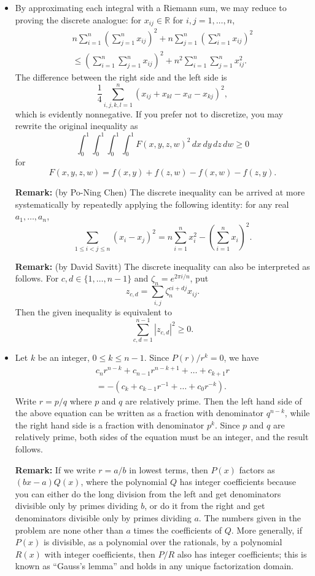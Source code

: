 \documentclass[amssymb,twocolumn,pra,10pt,aps]{revtex4-1}
\newcommand{\RR}{\mathbb{R}}
\begin{document}
\begin{itemize}
\item[A6]
By approximating each integral with a Riemann sum, we may reduce to
proving the discrete analogue: for $x_{ij} \in \RR$ for
$i,j=1, \dots, n$,
\begin{multline*}
n \sum_{i=1}^n \left( \sum_{j=1}^n x_{ij} \right)^2
+ n \sum_{j=1}^n \left( \sum_{i=1}^n x_{ij} \right)^2 \\
\leq \left( \sum_{i=1}^n \sum_{j=1}^n x_{ij} \right)^2
+ n^2 \sum_{i=1}^n \sum_{j=1}^n x_{ij}^2.
\end{multline*}
The difference between the right side and the left side is
\[
\frac{1}{4} \sum_{i,j,k,l=1}^n (x_{ij} + x_{kl} - x_{il} - x_{kj})^2,
\]
which is evidently nonnegative. If you prefer not to discretize,
you may rewrite the original inequality as
\[
\int_0^1 \int_0^1 \int_0^1 \int_0^1 F(x,y,z,w)^2
\,dx\,dy\,dz\,dw \geq 0
\]
for
\[
F(x,y,z,w) = f(x,y) + f(z,w) - f(x,w) - f(z,y).
\]

\textbf{Remark:} (by Po-Ning Chen)
The discrete inequality can be arrived at more systematically
by repeatedly applying the following identity: for
any real $a_1, \dots, a_n$,
\[
\sum_{1 \leq i < j \leq n} (x_i - x_j)^2
= n \sum_{i=1}^n x_i^2 - \left( \sum_{i=1}^n x_i \right)^2.
\]

\textbf{Remark:} (by David Savitt)
The discrete inequality can also be interpreted as follows.
For $c,d \in \{1, \dots, n-1\}$ and $\zeta_n = e^{2\pi i/n}$, put
\[
z_{c,d} = \sum_{i,j} \zeta_n^{c i + d j} x_{ij}.
\]
Then the given inequality is equivalent to
\[
\sum_{c,d=1}^{n-1} |z_{c,d}|^2 \geq 0.
\]

\item[B1]
Let $k$ be an integer, $0\leq k\leq n-1$. Since $P(r)/r^k = 0$, we
have
\begin{multline*}
c_n r^{n-k} + c_{n-1} r^{n-k+1} + \dots + c_{k+1} r \\
= - (c_k + c_{k-1} r^{-1} + \dots + c_0 r^{-k}).
\end{multline*}
Write $r = p/q$ where $p$ and $q$ are relatively prime. Then the
left hand side of the above equation can be written as a fraction
with denominator $q^{n-k}$, while the right hand side is a fraction
with denominator $p^k$. Since $p$ and $q$ are relatively prime, both
sides of the equation must be an integer, and the result follows.

\textbf{Remark:}
If we write $r = a/b$ in lowest terms, then $P(x)$ factors as $(bx-a)Q(x)$,
where the polynomial $Q$ has integer coefficients because you can
either do the long division from the left and get denominators divisible only
by primes dividing $b$, or do it from the right and get denominators
divisible only by primes dividing $a$. The numbers given in the problem
are none other than $a$ times the coefficients of $Q$.
More generally, if $P(x)$ is divisible,
as a polynomial over the rationals, by a polynomial $R(x)$ with integer
coefficients, then $P/R$ also has integer coefficients; this is known
as ``Gauss's lemma'' and holds in any unique factorization domain.


\end{itemize}
\end{document}
